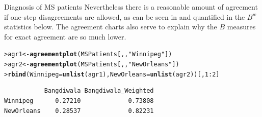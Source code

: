 \documentclass[10pt,krantz2]{krantz}\usepackage[]{graphicx}\usepackage[]{color}
\makeatletter
\newcommand{\hlnum}[1]{\textcolor[rgb]{0.686,0.059,0.569}{#1}}%
\newcommand{\hlstr}[1]{\textcolor[rgb]{0.192,0.494,0.8}{#1}}%
\newcommand{\hlopt}[1]{\textcolor[rgb]{0,0,0}{#1}}%
\newcommand{\hlstd}[1]{\textcolor[rgb]{0.345,0.345,0.345}{#1}}%
\newcommand{\hlkwb}[1]{\textcolor[rgb]{0.69,0.353,0.396}{#1}}%
\newcommand{\hlkwc}[1]{\textcolor[rgb]{0.333,0.667,0.333}{#1}}%
\newcommand{\hlkwd}[1]{\textcolor[rgb]{0.737,0.353,0.396}{\textbf{#1}}}%
\newenvironment{kframe}{%
 \def\at@end@of@kframe{}%
 \ifinner\ifhmode%
  \def\at@end@of@kframe{\end{minipage}}%
  \begin{minipage}{\columnwidth}%
 \fi\fi%
 \def\FrameCommand##1{\hskip\@totalleftmargin \hskip-\fboxsep
 \colorbox{shadecolor}{##1}\hskip-\fboxsep
     \hskip-\linewidth \hskip-\@totalleftmargin \hskip\columnwidth}%
 \MakeFramed {\advance\hsize-\width
   \@totalleftmargin\z@ \linewidth\hsize
   \@setminipage}}%
 {\par\unskip\endMakeFramed%
 \at@end@of@kframe}
\newenvironment{knitrout}{}{} %
\renewenvironment{knitrout}{\small\renewcommand{\baselinestretch}{.85}}{} %
\makeatother
\begin{document}
\begin{Example}[MS2]{Diagnosis of MS patients}
Nevertheless there is a reasonable amount of agreement if one-step
disagreements are allowed, as can be seen in 
and quantified in the $B^w$ statistics below.
The agreement charts also serve to explain why the $B$ measures for
exact agreement are so much lower.
\begin{knitrout}
\color{fgcolor}\begin{kframe}
\begin{alltt}
\hlstd{> }\hlstd{agr1} \hlkwb{<-} \hlkwd{agreementplot}\hlstd{(MSPatients[, ,} \hlstr{"Winnipeg"}\hlstd{])}
\hlstd{> }\hlstd{agr2} \hlkwb{<-} \hlkwd{agreementplot}\hlstd{(MSPatients[, ,} \hlstr{"New Orleans"}\hlstd{])}
\hlstd{> }\hlkwd{rbind}\hlstd{(}\hlkwc{Winnipeg} \hlstd{=} \hlkwd{unlist}\hlstd{(agr1),} \hlkwc{NewOrleans} \hlstd{=} \hlkwd{unlist}\hlstd{(agr2))[,} \hlnum{1} \hlopt{:} \hlnum{2}\hlstd{]}
\end{alltt}
\begin{verbatim}
           Bangdiwala Bangdiwala_Weighted
Winnipeg      0.27210             0.73808
NewOrleans    0.28537             0.82231
\end{verbatim}
\end{kframe}
\end{knitrout}

\end{Example}
\end{document}
